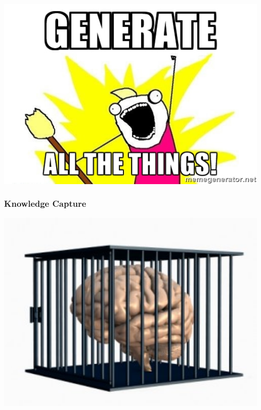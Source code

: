 \documentclass[t,12pt,numbers,fleqn]{beamer}
\begin{document}





\begin{frame}
\includegraphics[width=1\textwidth]{../Figures/generate_all_the_things.jpg}
\end{frame}


\begin{frame}

\frametitle{Knowledge Capture}

\includegraphics[width=1.0\textwidth]{../Figures/KC.jpg}

\end{frame}
\end{document}
